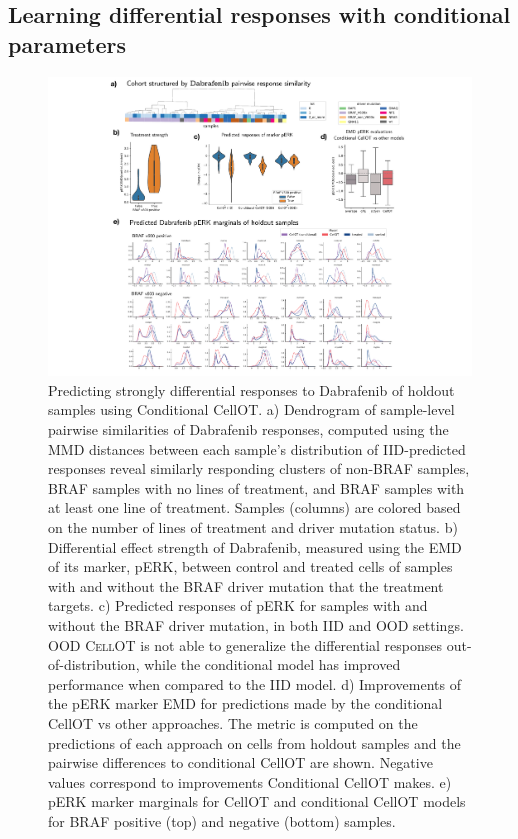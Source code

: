 \subsection{Learning differential responses with conditional parameters}

\begin{figure}[htp!]
  \begin{center}
    \includegraphics[width=\textwidth]{figures/cellot-cohort/condot.pdf}
  \end{center}
  \caption{
    Predicting strongly differential responses to Dabrafenib of holdout samples using Conditional CellOT.
    a) Dendrogram of sample-level pairwise similarities of Dabrafenib responses, computed using the MMD distances between each sample's distribution of IID-predicted responses reveal similarly responding clusters of non-BRAF samples, BRAF samples with no lines of treatment, and BRAF samples with at least one line of treatment.
    Samples (columns) are colored based on the number of lines of treatment and driver mutation status.
    b) Differential effect strength of Dabrafenib, measured using the EMD of its marker, pERK, between control and treated cells of samples with and without the BRAF driver mutation that the treatment targets.
    c) Predicted responses of pERK for samples with and without the BRAF driver mutation, in both IID and OOD settings.
    OOD \textsc{CellOT} is not able to generalize the differential responses out-of-distribution, while the conditional model has improved performance when compared to the IID model.
    d) Improvements of the pERK marker EMD for predictions made by the conditional CellOT vs other approaches. The metric is computed on the predictions of each approach on cells from holdout samples and the pairwise differences to conditional CellOT are shown. Negative values correspond to improvements Conditional CellOT makes. 
    e) pERK marker marginals for CellOT and conditional CellOT models for BRAF positive (top) and negative (bottom) samples.
  }\label{fig:conditional-ot}
\end{figure}

